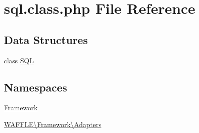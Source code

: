 \hypertarget{sql_8class_8php}{}\section{sql.\+class.\+php File Reference}
\label{sql_8class_8php}
\subsection*{Data Structures}
\begin{DoxyCompactItemize}
\item 
class \hyperlink{class_w_a_f_f_l_e_1_1_framework_1_1_adapters_1_1_s_q_l}{S\+QL}
\end{DoxyCompactItemize}
\subsection*{Namespaces}
\begin{DoxyCompactItemize}
\item 
 \hyperlink{namespace_framework}{Framework}
\item 
 \hyperlink{namespace_w_a_f_f_l_e_1_1_framework_1_1_adapters}{W\+A\+F\+F\+L\+E\textbackslash{}\+Framework\textbackslash{}\+Adapters}
\end{DoxyCompactItemize}
